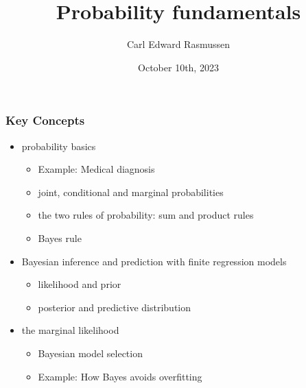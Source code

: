 

\title{Probability fundamentals}
\author{Carl Edward Rasmussen}
\date{October 10th, 2023}



\begin{frame}
\titlepage
\end{frame}

\begin{frame}
\frametitle{Key Concepts}

\begin{itemize}
\item probability basics
\begin{itemize}
\item Example: Medical diagnosis
\item joint, conditional and marginal probabilities
\item the two rules of probability: sum and product rules
\item Bayes rule
\end{itemize}
\item Bayesian inference and prediction with finite regression models
\begin{itemize}
\item likelihood and prior
\item posterior and predictive distribution
\end{itemize}
\item the marginal likelihood
\begin{itemize}
\item Bayesian model selection
\item Example: How Bayes avoids overfitting
\end{itemize}
\end{itemize}
\end{frame}


